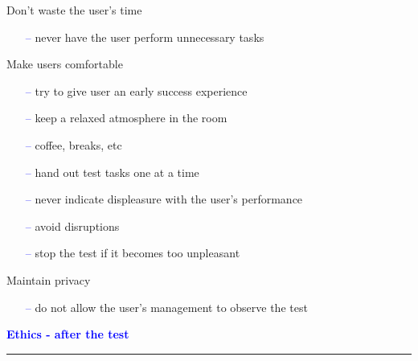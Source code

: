 \documentclass[pdf]{beamer}
\begin{document}
{{{{{{{{{{{{{{{{\begin{frame}
	{\Large Don't waste the user's time}\par
    \begin{itemize}
		\item[\textcolor{Blue}{--}]never have the user perform unnecessary tasks
	\end{itemize}
	{\Large Make users comfortable}\par
	\begin{itemize}
		\item[\textcolor{Blue}{--}]try to give user an early success experience
		\item[\textcolor{Blue}{--}]keep a relaxed atmosphere in the room 
		\item[\textcolor{Blue}{--}]coffee, breaks, etc
		\item[\textcolor{Blue}{--}]hand out test tasks one at a time
		\item[\textcolor{Blue}{--}]never indicate displeasure with the user’s performance
		\item[\textcolor{Blue}{--}]avoid disruptions
		\item[\textcolor{Blue}{--}]stop the test if it becomes too unpleasant
        \newline
    \end{itemize}	

	{\Large Maintain privacy}\par
    \begin{itemize}
		\item[\textcolor{Blue}{--}]do not allow the user’s management to observe the test
    \end{itemize}
\end{frame}



{
\begin{frame}
	\vspace{8mm}
	\textcolor{Blue}{\textbf{\large{Ethics - after the test}}}
    \textcolor{red}{\rule{10cm}{1mm}}
    

\end{frame}}}}}}}}}}}}}}}}}}
\end{document}
